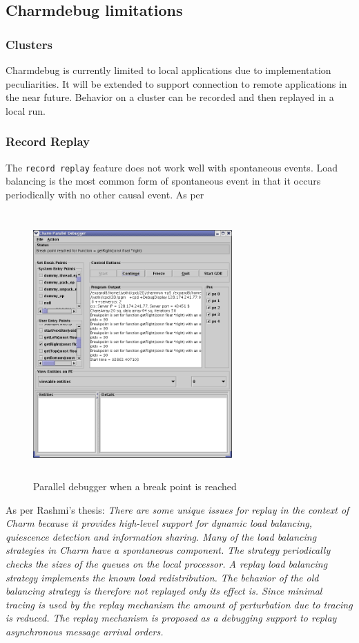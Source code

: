 \documentclass[10pt]{article}
\begin{document}
\subsection{Charmdebug limitations}

\subsubsection{Clusters}

Charmdebug is currently limited to local applications due to
implementation peculiarities.  It will be extended to support
connection to remote applications in the near future.  Behavior on a
cluster can be recorded and then replayed in a local run.

\subsubsection{Record Replay}
The \texttt{record replay} feature does not work well with spontaneous
events.  Load balancing is the most common form of spontaneous event
in that it occurs periodically with no other causal event. As per

\begin{figure}[]
\includegraphics[scale=0.5,height=4in, width=3in]{figs/snapshot3}
\caption{Parallel debugger when a break point is reached}
\label{snapshot3}
\end{figure}

As per Rashmi's thesis: \textit{ There are some unique issues for
replay in the context of Charm because it provides high-level support
for dynamic load balancing, quiescence detection and information
sharing. Many of the load balancing strategies in Charm have a
spontaneous component. The strategy periodically checks the sizes of
the queues on the local processor. A replay load balancing strategy
implements the known load redistribution. The behavior of the old
balancing strategy is therefore not replayed only its effect is. Since
minimal tracing is used by the replay mechanism the amount of
perturbation due to tracing is reduced. The replay mechanism is
proposed as a debugging support to replay asynchronous message arrival
orders.}
\end{document}
